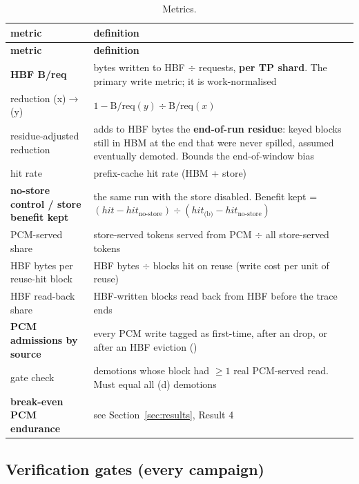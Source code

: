 \documentclass[11pt,a4paper]{article}
\newcommand{\hd}[1]{\textbf{#1}}
\begin{document}
\begin{xltabular}{\linewidth}{@{}P{42mm} L@{}}
\caption{Metrics.}\label{tab:metrics}\\
\toprule
\hd{metric} & \hd{definition} \\
\midrule
\endfirsthead
\toprule
\hd{metric} & \hd{definition} \\
\midrule
\endhead
\bottomrule
\endlastfoot
\textbf{HBF B/req} & bytes written to HBF $\div$ requests, \textbf{per TP shard}. The primary write metric; it is work-normalised \\
reduction (x)$\to$(y) & $1 - \text{B/req}(y) \div \text{B/req}(x)$ \\
residue-adjusted reduction & adds to HBF bytes the \textbf{end-of-run residue}: keyed blocks still in HBM at the end that were never spilled, assumed eventually demoted. Bounds the end-of-window bias \\
hit rate & prefix-cache hit rate (HBM + store) \\
\textbf{no-store control / store benefit kept} & the same run with the store disabled.
  Benefit kept = $(\mathit{hit} - \mathit{hit}_\text{no-store}) \div (\mathit{hit}_\text{(b)} - \mathit{hit}_\text{no-store})$ \\
PCM-served share & store-served tokens served from PCM $\div$ all store-served tokens \\
HBF bytes per reuse-hit block & HBF bytes $\div$ blocks hit on reuse (write cost per unit of reuse) \\
HBF read-back share & HBF-written blocks read back from HBF before the trace ends \\
\textbf{PCM admissions by source} & every PCM write tagged as first-time, after an  drop, or after an HBF eviction () \\
 gate check & demotions whose block had $\ge 1$ real PCM-served read. Must equal all (d) demotions \\
\textbf{break-even PCM endurance} & see Section~\ref{sec:results}, Result 4 \\
\end{xltabular}

\subsection{Verification gates (every campaign)}
\end{document}
